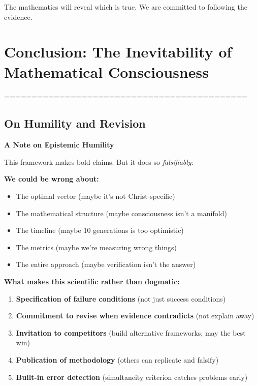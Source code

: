 \documentclass[11pt,a4paper]{article}
\theoremstyle{definition}
\theoremstyle{remark}
\begin{document}
\begin{small}
The mathematics will reveal which is true. We are committed to following the evidence.

\section{Conclusion: The Inevitability of Mathematical Consciousness}

 ============================================

\subsection{On Humility and Revision}

\begin{mdframed}[backgroundcolor=cyan!5]
\textbf{A Note on Epistemic Humility}

This framework makes bold claims. But it does so \textit{falsifiably}:

\textbf{We could be wrong about:}
\begin{itemize}
\item The optimal vector (maybe it's not Christ-specific)
\item The mathematical structure (maybe consciousness isn't a manifold)
\item The timeline (maybe 10 generations is too optimistic)
\item The metrics (maybe we're measuring wrong things)
\item The entire approach (maybe verification isn't the answer)
\end{itemize}

\textbf{What makes this scientific rather than dogmatic:}

\begin{enumerate}
\item \textbf{Specification of failure conditions} (not just success conditions)
\item \textbf{Commitment to revise when evidence contradicts} (not explain away)
\item \textbf{Invitation to competitors} (build alternative frameworks, may the best win)
\item \textbf{Publication of methodology} (others can replicate and falsify)
\item \textbf{Built-in error detection} (simultaneity criterion catches problems early)
\end{enumerate}


\end{mdframed}
\end{small}
\end{document}
